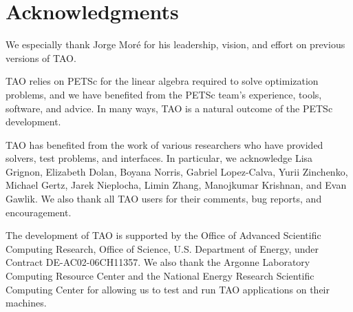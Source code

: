 %
%

\section*{Acknowledgments}

We especially thank Jorge Mor\'e for his leadership, vision, and effort on 
previous versions of TAO.  

TAO relies on PETSc for the linear algebra required to solve optimization
problems, and we have benefited from the PETSc team's experience, tools, 
software, 
and advice. In many ways, TAO is a natural outcome of the PETSc 
development.  

TAO has benefited from the work of various researchers who have provided 
solvers, test problems, and interfaces.  In particular, we acknowledge Lisa 
Grignon, Elizabeth Dolan, Boyana Norris, Gabriel Lopez-Calva, Yurii Zinchenko, 
Michael Gertz, Jarek Nieplocha, Limin Zhang, Manojkumar Krishnan, and Evan 
Gawlik.  We also thank all TAO users for their comments, bug reports, and 
encouragement.

The development of TAO is supported by the Office of Advanced Scientific 
Computing Research, Office of Science, U.S. Department of Energy, under 
Contract DE-AC02-06CH11357.  We also thank the Argonne Laboratory Computing 
Resource Center and the National Energy Research Scientific Computing Center 
for allowing us to test and run TAO applications on their machines.

